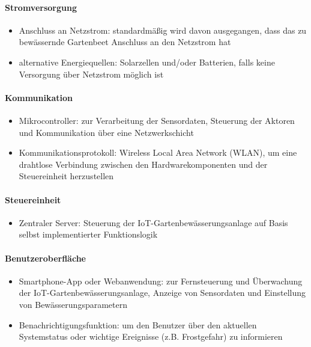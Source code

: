 \paragraph{Stromversorgung}
\begin{itemize}
\item Anschluss an Netzstrom: standardmäßig wird davon ausgegangen, dass das zu bewässernde Gartenbeet Anschluss an den Netzstrom hat
\item alternative Energiequellen: Solarzellen und/oder Batterien, falls keine Versorgung über Netzstrom möglich ist
\end{itemize}

\paragraph{Kommunikation}
\begin{itemize}
\item Mikrocontroller: zur Verarbeitung der Sensordaten, Steuerung der Aktoren und Kommunikation über eine Netzwerkschicht
\item Kommunikationsprotokoll: Wireless Local Area Network (WLAN), um eine drahtlose Verbindung zwischen den Hardwarekomponenten und der Steuereinheit herzustellen
\end{itemize}

\paragraph{Steuereinheit}
\begin{itemize}
\item Zentraler Server: Steuerung der IoT-Gartenbewässerungsanlage auf Basis selbst implementierter Funktionslogik
\end{itemize}

\paragraph{Benutzeroberfläche}
\begin{itemize}
\item Smartphone-App oder Webanwendung: zur Fernsteuerung und Überwachung der IoT-Gartenbewässerungsanlage, Anzeige von Sensordaten und Einstellung von Bewässerungsparametern
\item Benachrichtigungsfunktion: um den Benutzer über den aktuellen Systemstatus oder wichtige Ereignisse (z.B. Frostgefahr) zu informieren
\end{itemize}

